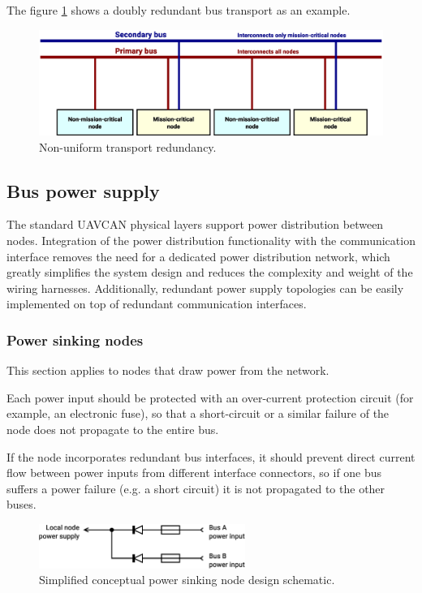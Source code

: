 The figure \ref{fig:phy_non_uniform_transport_redundancy} shows a doubly redundant bus transport as an example.

\begin{figure}[H]
    \centering
	\includegraphics[width=\textwidth]{physical_layer/non_uniform_bus_redundancy}
	\caption{Non-uniform transport redundancy.\label{fig:phy_non_uniform_transport_redundancy}}
\end{figure}

\subsection{Bus power supply}

The standard UAVCAN physical layers support power distribution between nodes.
Integration of the power distribution functionality with the communication interface
removes the need for a dedicated power distribution network,
which greatly simplifies the system design and reduces the complexity and weight of the wiring harnesses.
Additionally, redundant power supply topologies can be easily implemented on top of redundant communication interfaces.

\subsubsection{Power sinking nodes}

This section applies to nodes that draw power from the network.

Each power input should be protected with an over-current protection circuit (for example, an electronic fuse),
so that a short-circuit or a similar failure of the node does not propagate to the entire bus.

If the node incorporates redundant bus interfaces,
it should prevent direct current flow between power inputs from different interface connectors,
so if one bus suffers a power failure (e.g. a short circuit) it is not propagated to the other buses.

\begin{figure}[H]
    \centering
	\includegraphics[width=0.6\textwidth]{physical_layer/redundant_bus_power_sink}
	\caption{Simplified conceptual power sinking node design schematic.\label{fig:phy_redundant_bus_power_sink}}
\end{figure}

